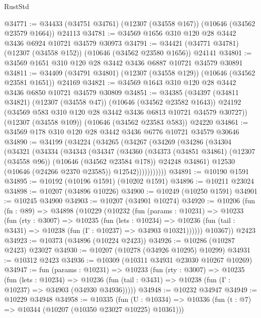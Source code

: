 \begin{lexlean}{RustStd}
\begin{coremodule}
@34771 := @34433 (@34751 @34761) (@12307 (@34558 @167)) (@10646 (@34562 @23579 @1664)) @24113
@34781 := @34569 @1656 @310 @120 @28 @3442 @3436 @6924 @10721 @34579 @30973
@34791 := @34421 (@34771 @34781) (@12307 (@34558 @152)) (@10646 (@34562 @23580 @1656)) @24141
@34801 := @34569 @1651 @310 @120 @28 @3442 @3436 @6887 @10721 @34579 @30891
@34811 := @34409 (@34791 @34801) (@12307 (@34558 @129)) (@10646 (@34562 @23581 @1651)) @24169
@34821 := @34569 @1643 @310 @120 @28 @3442 @3436 @6850 @10721 @34579 @30809
@34851 := @34385
    (@34397
      (@34811 @34821)
      (@12307 (@34558 @47))
      (@10646 (@34562 @23582 @1643))
      @24192
      (@34569 @583 @310 @120 @28 @3442 @3436 @6813 @10721 @34579 @30727))
    (@12307 (@34558 @109))
    (@10646 (@34562 @23583 @583))
    @24220
@34861 := @34569 @178 @310 @120 @28 @3442 @3436 @6776 @10721 @34579 @30646
@34890 := @34199
    (@34224
      (@34265
        (@34267
          (@34269
            (@34286
              (@34304
                (@34321
                  (@34334
                    (@34343
                      (@34347
                        (@34360
                          (@34373
                            (@34851 @34861)
                            (@12307 (@34558 @96))
                            (@10646 (@34562 @23584 @178))
                            @24248
                            @34861)
                          @12530
                          (@10646 (@24266 @2370 @23585))
                          @12542)))))))))))
@34891 := @10190 @1591
@34895 := @10192 (@10196 @1591) (@10202 @1591)
@34896 := @10211 @23024
@34898 := @10207 (@34896 @10226)
@34900 := @10249 (@10250 @1591)
@34901 := @10245 @34900
@34903 := @10207 (@34901 @10274)
@34920 := @10206
    (fun (fn : @89) =>
    @34898
      (@10229
        (@10232
          (fun (params : @10231) =>
          @10233
            (fun (rty : @3007) =>
            @10235
              (fun (lets : @10234) =>
              @10236 (fun (tail : @3431) => @10238 (fun (Γ : @10237) => @34903 @10321))))))
        @10367))
    @2423
@34923 := @10373 (@34896 (@10224 @2423))
@34926 := @10286 (@10287 @2423) @23027
@34930 := @10207 (@10278 (@34926 @10295) @10299)
@34931 := @10312 @2423
@34936 := @10309 (@10311 @34931 @23030 @10267 @10269)
@34947 := fun (params : @10231) =>
  @10233
    (fun (rty : @3007) =>
    @10235
      (fun (lets : @10234) =>
      @10236 (fun (tail : @3431) => @10238 (fun (Γ : @10237) => @34903 (@34930 @34936)))))
@34948 := @10232 @34947
@34949 := @10229 @34948
@34958 := @10335
    (fun (U : @10334) => @10336 (fun (t : @7) => @10344 (@10207 (@10350 @23027 @10225) @10361)))

\end{coremodule}
\end{lexlean}

